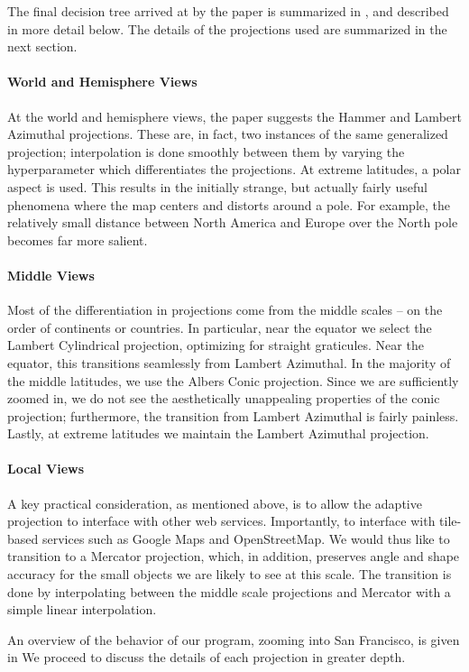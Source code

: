 The final decision tree arrived at by the paper is summarized in
  , and described in more detail below.
The details of the projections used are summarized in the next section.

\paragraph{World and Hemisphere Views}
At the world and hemisphere views, the paper suggests the Hammer and Lambert
  Azimuthal projections.
These are, in fact, two instances of the same generalized projection;
  interpolation is done smoothly between them by varying the hyperparameter
  which differentiates the projections.
At extreme latitudes, a polar aspect is used.
This results in the initially strange, but actually fairly useful phenomena
  where the map centers and distorts around a pole.
For example, the relatively small distance between North America and Europe
  over the North pole becomes far more salient.

\paragraph{Middle Views}
Most of the differentiation in projections come from the middle scales -- on the
  order of continents or countries.
In particular, near the equator we select the Lambert Cylindrical projection,
  optimizing for straight graticules.
Near the equator, this transitions seamlessly from Lambert Azimuthal.
In the majority of the middle latitudes, we use the Albers Conic projection.
Since we are sufficiently zoomed in, we do not see the aesthetically unappealing
  properties of the conic projection; furthermore, the transition from
  Lambert Azimuthal is fairly painless.
Lastly, at extreme latitudes we maintain the Lambert Azimuthal projection.

\paragraph{Local Views}
A key practical consideration, as mentioned above, is to allow the adaptive
  projection to interface with other web services.
Importantly, to interface with tile-based services such as Google Maps and
  OpenStreetMap.
We would thus like to transition to a Mercator projection, which, in addition,
  preserves angle and shape accuracy for the small objects we are likely to
  see at this scale.
The transition is done by interpolating between the middle scale projections
  and Mercator with a simple linear interpolation.

An overview of the behavior of our program, zooming into San Francisco, is
  given in 
We proceed to discuss the details of each projection in greater depth.
